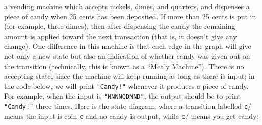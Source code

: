  a vending machine which accepts nickels, dimes, and quarters,
and dispenses a piece of candy when 25 cents has been deposited. If more than 25 cents
is put in (for example, three dimes), then after dispensing the candy the remaining
amount is applied toward the next transaction (that is, it doesn't give any change).
One difference in this machine is that each edge in the graph will
give not only a new state but also an indication of whether candy was given out on
the transition (technically, this is known as a ``Mealy Machine''). There is no accepting state, since the machine will keep
running as long as there is input; in the code below, we will print \verb|"Candy!"|
whenever it produces a piece of candy. For example, when the input is \verb|"NNNNQDNND"|,
the output should be to print \verb|"Candy!"| three times. Here is the state diagram, where a transition labelled \texttt{c}/\0 means the input is coin \texttt{c} and no candy is output, while \texttt{c}/\1 means you get candy:
\begin{center}
\end{center}

